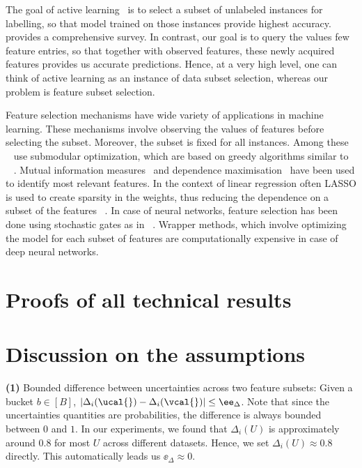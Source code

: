 \documentclass[letterpaper]{article}
\renewcommand{\cite}{\citep}
\begin{document}
 The goal of active learning~\cite{active1,active2,active3,active4,active5,active6,active7} is to select a subset of unlabeled instances for labelling, so that model trained on those instances provide highest accuracy.~\citet{activeSurvey} provides a comprehensive survey.
In contrast, our goal is to query the values few feature entries, so that together with observed features, these newly acquired features provides us accurate predictions.
Hence, at a very high level, one can think of active learning as an instance of data subset selection, whereas our problem is feature subset selection.


 Feature selection mechanisms have wide variety of applications in machine learning. These mechanisms involve observing the values of features before selecting the subset. Moreover, the subset is fixed for all instances. Among these ~\cite{khanna2017scalable,killamsetty2021grad,harshaw2019submodular,das2018approximate} use submodular optimization, which are based on greedy algorithms similar to ~\cite{elenberg2018restricted,mirzasoleiman2015lazier} . Mutual information measures~\cite{estevez2009normalized} and dependence maximisation~\cite{song2012feature} have been used to identify most relevant features. In the context of linear regression often LASSO is used to create sparsity in the weights, thus reducing the dependence on a subset of the features~\cite{hans2009bayesian} . In case of neural networks, feature selection has been done using stochastic gates as in~\cite{yamada2020feature} . Wrapper methods, which involve optimizing the model for each subset of features are computationally expensive in case of deep neural networks.


\section{Proofs of all technical results}
\label{app:proofs}



\section{Discussion on the assumptions}
\label{app:assump}
\textbf{(1)} Bounded difference between uncertainties across two feature subsets: Given a bucket $b\in [B]$, $|\Delta_i(\ucal{}) - \Delta_i(\vcal{})| \le \ee_{\Delta}$.  Note that since the uncertainties quantities are probabilities, the difference is always bounded between $0$ and $1$.
In our experiments, we found that $\Delta_i(U)$ is approximately around $0.8$ for most $U$ across different datasets. Hence, we set $\Delta_i(U) \approx 0.8$ directly. This automatically leads us $\ee_\Delta \approx 0$.
\end{document}
